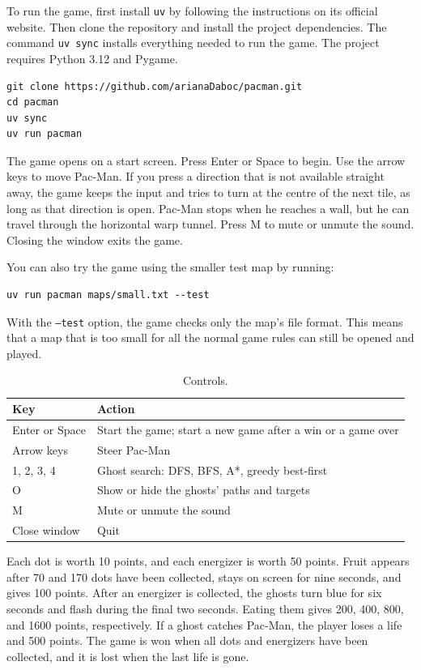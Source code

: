 \documentclass[12pt,a4paper]{article}
\begin{document}
To run the game, first install \texttt{uv} by following the instructions on its official website. Then clone the repository and install the project dependencies. The command \texttt{uv sync} installs everything needed to run the game. The project requires Python 3.12 and Pygame.\cite{uv,pygame}

\begin{verbatim}
git clone https://github.com/arianaDaboc/pacman.git
cd pacman
uv sync
uv run pacman
\end{verbatim}

The game opens on a start screen. Press Enter or Space to begin. Use the arrow keys to move Pac-Man. If you press a direction that is not available straight away, the game keeps the input and tries to turn at the centre of the next tile, as long as that direction is open. Pac-Man stops when he reaches a wall, but he can travel through the horizontal warp tunnel. Press M to mute or unmute the sound. Closing the window exits the game.

You can also try the game using the smaller test map by running:

\begin{verbatim}
uv run pacman maps/small.txt --test
\end{verbatim}

With the \texttt{--test} option, the game checks only the map's file format. This means that a map that is too small for all the normal game rules can still be opened and played.

\begin{table}[H]
  \centering
  \caption{Controls.}
  \begin{tabular}{@{}ll@{}}
    \toprule
    \textbf{Key} & \textbf{Action} \\
    \midrule
    Enter or Space & Start the game; start a new game after a win or a game over \\
    Arrow keys & Steer Pac-Man \\
    1, 2, 3, 4 & Ghost search: DFS, BFS, A*, greedy best-first \\
    O & Show or hide the ghosts' paths and targets \\
    M & Mute or unmute the sound \\
    Close window & Quit \\
    \bottomrule
  \end{tabular}
\end{table}

Each dot is worth 10 points, and each energizer is worth 50 points. Fruit appears after 70 and 170 dots have been collected, stays on screen for nine seconds, and gives 100 points. After an energizer is collected, the ghosts turn blue for six seconds and flash during the final two seconds. Eating them gives 200, 400, 800, and 1600 points, respectively. If a ghost catches Pac-Man, the player loses a life and 500 points. The game is won when all dots and energizers have been collected, and it is lost when the last life is gone.
\end{document}
